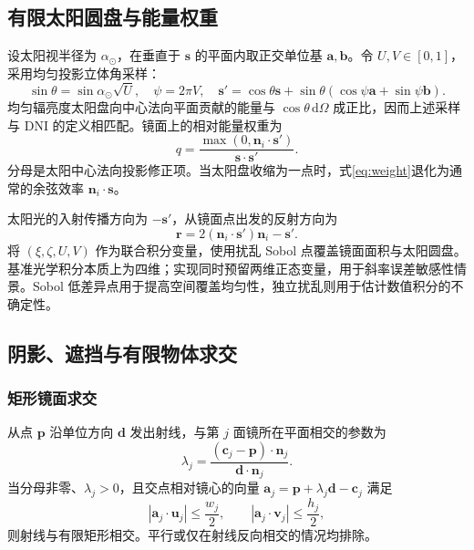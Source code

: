 \documentclass[UTF8,a4paper,zihao=-4,fontset=mac]{ctexart}
\newcommand{\vect}[1]{\bm{#1}}
\newcommand{\dd}{\mathrm d}
\newcommand{\DNI}{\mathrm{DNI}}
\begin{document}
\subsection{有限太阳圆盘与能量权重}
设太阳视半径为 $\alpha_\odot$，在垂直于 $\vect s$ 的平面内取正交单位基 $\vect a,\vect b$。令 $U,V\in[0,1]$，采用均匀投影立体角采样：
\begin{equation}
\sin\theta=\sin\alpha_\odot\sqrt U,\quad \psi=2\pi V,
\quad \vect s'=\cos\theta\vect s+\sin\theta(\cos\psi\vect a+\sin\psi\vect b).
\end{equation}
均匀辐亮度太阳盘向中心法向平面贡献的能量与 $\cos\theta\,\dd\Omega$ 成正比，因而上述采样与 $\DNI$ 的定义相匹配。镜面上的相对能量权重为
\begin{equation}
q=\frac{\max(0,\vect n_i\cdot\vect s')}{\vect s\cdot\vect s'}.
\label{eq:weight}
\end{equation}
分母是太阳中心法向投影修正项。当太阳盘收缩为一点时，式\eqref{eq:weight}退化为通常的余弦效率 $\vect n_i\cdot\vect s$。

太阳光的入射传播方向为 $-\vect s'$，从镜面点出发的反射方向为
\begin{equation}
\vect r=2(\vect n_i\cdot\vect s')\vect n_i-\vect s'.
\label{eq:reflection}
\end{equation}
将 $(\xi,\zeta,U,V)$ 作为联合积分变量，使用扰乱 Sobol 点覆盖镜面面积与太阳圆盘。基准光学积分本质上为四维；实现同时预留两维正态变量，用于斜率误差敏感性情景。Sobol 低差异点用于提高空间覆盖均匀性，独立扰乱则用于估计数值积分的不确定性\cite{sobol,owen}。

\subsection{阴影、遮挡与有限物体求交}
\subsubsection{矩形镜面求交}
从点 $\vect p$ 沿单位方向 $\vect d$ 发出射线，与第 $j$ 面镜所在平面相交的参数为
\begin{equation}
\lambda_j=\frac{(\vect c_j-\vect p)\cdot\vect n_j}{\vect d\cdot\vect n_j}.
\end{equation}
当分母非零、$\lambda_j>0$，且交点相对镜心的向量 $\vect a_j=\vect p+\lambda_j\vect d-\vect c_j$ 满足
\begin{equation}
|\vect a_j\cdot\vect u_j|\le\frac{w_j}{2},\qquad
|\vect a_j\cdot\vect v_j|\le\frac{h_j}{2},
\label{eq:rect}
\end{equation}
则射线与有限矩形相交。平行或仅在射线反向相交的情况均排除。
\end{document}
